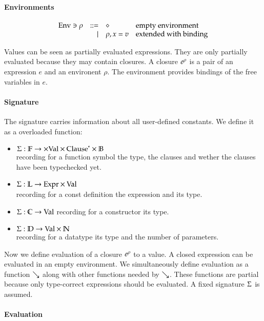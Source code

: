 \paragraph{Environments}
\[
\begin{array}{lrll}
\mathrm{Env} \ni \rho & ::= & \diamond & \mbox{empty environment}\\
& \mid & \rho,x = v & \mbox{extended with binding}\\
\end{array}
\]

Values can be seen as partially evaluated expressions.
They are only partially evaluated because they may contain closures.
A closure $e^{\rho}$ is a pair of an expression $e$ and an environent $\rho$.
The environment provides bindings of the free variables in $e$.
\paragraph*{Signature}
The signature carries information about all user-defined constants.
We define it as a overloaded function:
\begin{itemize}
\item
$ \mathrm{\Sigma} : \mathbb{F} \rightarrow \times \mathrm{Val} \times {\mathrm{Clause}}^{\ast} \times \mathbb{B} $\\
recording for a function symbol the type, the clauses and wether the clauses have been typechecked yet.
\item
$ \mathrm{\Sigma} : \mathbb{L} \rightarrow \mathrm{Expr} \times \mathrm{Val} $ \\
recording for a const definition the expression and its type. 
\item
$ \mathrm{\Sigma} : \mathbb{C} \rightarrow \mathrm{Val} $
recording for a constructor its type.
\item
$ \mathrm{\Sigma} : \mathbb{D} \rightarrow \mathrm{Val} \times \mathbb{N} $\\
recording for a datatype its type and the number of parameters.
\end{itemize}

Now we define evaluation of a closure $e^{\rho}$ to a value. 
A closed expression can be evaluated in an empty environment.
We simultaneously define evaluation as a function $\searrow$ along with other functions needed by $\searrow$.     
These functions are partial because only type-correct expressions should be evaluated.
A fixed signature $\mathrm{\Sigma}$ is assumed.

\paragraph*{Evaluation}

